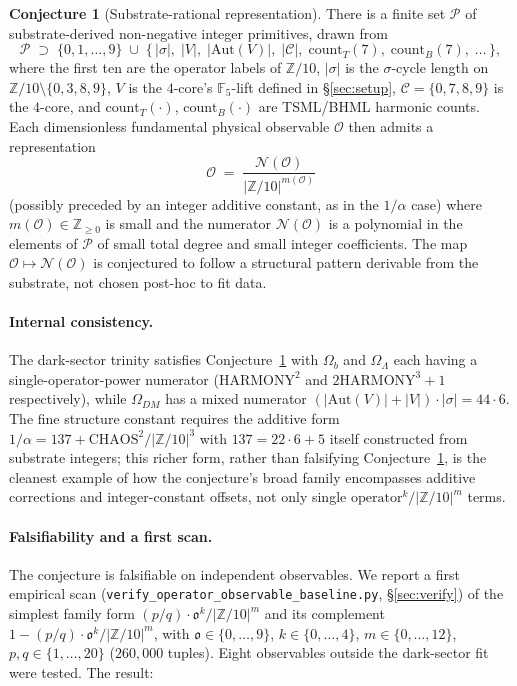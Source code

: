\documentclass[11pt,reqno]{amsart}
\theoremstyle{plain}
\theoremstyle{definition}
\newtheorem{conjecture}[theorem]{Conjecture}
\theoremstyle{remark}
\newcommand{\Z}{\mathbb{Z}}
\newcommand{\F}{\mathbb{F}}
\newcommand{\Aut}{\mathrm{Aut}}
\begin{document}
\begin{conjecture}[Substrate-rational representation]\label{conj:op-obs}
There is a finite set $\mathcal{P}$ of substrate-derived
non-negative integer primitives, drawn from
\[
  \mathcal{P} \;\supset\;
    \{0, 1, \dots, 9\}
    \;\cup\;
    \{\,|\sigma|,\; |V|,\; |\Aut(V)|,\;
    |\mathcal{C}|,\; \mathrm{count}_{T}(7),\;
    \mathrm{count}_{B}(7),\; \dots\,\},
\]
where the first ten are the operator labels of $\Z/10$,
$|\sigma|$ is the $\sigma$-cycle length on
$\Z/10\setminus\{0,3,8,9\}$, $V$ is the $4$-core's
$\F_5$-lift defined in \S\ref{sec:setup},
$\mathcal{C} = \{0,7,8,9\}$ is the $4$-core, and
$\mathrm{count}_{T}(\cdot)$, $\mathrm{count}_{B}(\cdot)$ are
TSML/BHML harmonic counts. Each dimensionless fundamental
physical observable $\mathcal{O}$ then admits a representation
\[
  \mathcal{O} \;=\; \frac{\mathcal{N}(\mathcal{O})}{|\Z/10|^{m(\mathcal{O})}}
\]
(possibly preceded by an integer additive constant, as in the
$1/\alpha$ case) where $m(\mathcal{O}) \in \Z_{\geq 0}$ is small
and the numerator $\mathcal{N}(\mathcal{O})$ is a polynomial in
the elements of $\mathcal{P}$ of small total degree and small
integer coefficients. The map
$\mathcal{O} \mapsto \mathcal{N}(\mathcal{O})$ is conjectured
to follow a structural pattern derivable from the substrate,
not chosen post-hoc to fit data.
\end{conjecture}

\paragraph{Internal consistency.}
The dark-sector trinity satisfies
Conjecture~\ref{conj:op-obs} with $\Omega_b$ and $\Omega_\Lambda$
each having a single-operator-power numerator
($\mathrm{HARMONY}^{2}$ and $2\mathrm{HARMONY}^{3} + 1$
respectively), while $\Omega_{DM}$ has a mixed numerator
$(|\Aut(V)| + |V|) \cdot |\sigma| = 44 \cdot 6$. The fine
structure constant requires the additive form
$1/\alpha = 137 + \mathrm{CHAOS}^{2}/|\Z/10|^{3}$ with
$137 = 22 \cdot 6 + 5$ itself constructed from substrate
integers; this richer form, rather than falsifying
Conjecture~\ref{conj:op-obs}, is the cleanest example of how
the conjecture's broad family encompasses additive corrections
and integer-constant offsets, not only single
$\mathrm{operator}^{k}/|\Z/10|^{m}$ terms.

\paragraph{Falsifiability and a first scan.}
The conjecture is falsifiable on independent observables. We
report a first empirical scan
(\texttt{verify\_operator\_observable\_baseline.py}, \S\ref{sec:verify})
of the simplest family form
$(p/q) \cdot \mathfrak{o}^{k}/|\Z/10|^{m}$ and its complement
$1 - (p/q) \cdot \mathfrak{o}^{k}/|\Z/10|^{m}$, with
$\mathfrak{o} \in \{0, \dots, 9\}$, $k \in \{0, \dots, 4\}$,
$m \in \{0, \dots, 12\}$, $p, q \in \{1, \dots, 20\}$
($260{,}000$ tuples). Eight observables outside the
dark-sector fit were tested. The result:
\end{document}
